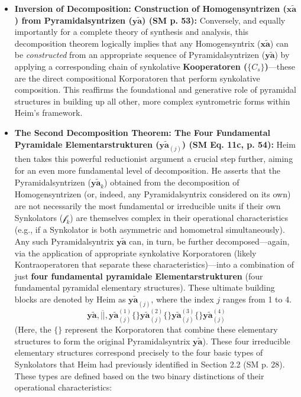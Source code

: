 \documentclass[12pt]{article}
\newcommand{\syntrix}{\bm{y\widetilde{a}}}
\newcommand{\homogeneoussyntrix}{\bm{x\widetilde{a}}}
\newcommand{\synkolator}{\mathcal{f}}
\newcommand{\elementarstruktur}{\bm{y\widetilde{a}}_{(j)}}
\begin{document}
\begin{itemize}
    \item \textbf{Inversion of Decomposition: Construction of Homogensyntrizen (\(\homogeneoussyntrix\)) from Pyramidalsyntrizen (\(\syntrix\)) (SM p. 53):}
    Conversely, and equally importantly for a complete theory of synthesis and analysis, this decomposition theorem logically implies that any Homogensyntrix (\(\homogeneoussyntrix\)) can be \textit{constructed} from an appropriate sequence of Pyramidalsyntrizen (\(\syntrix\)) by applying a corresponding chain of synkolative \textbf{Kooperatoren (\( \{C_s\} \))}—these are the direct compositional Korporatoren that perform synkolative composition. This reaffirms the foundational and generative role of pyramidal structures in building up all other, more complex syntrometric forms within Heim's framework.

    \item \textbf{The Second Decomposition Theorem: The Four Fundamental Pyramidale Elementarstrukturen (\(\elementarstruktur\)) (SM Eq. 11c, p. 54):}
    Heim then takes this powerful reductionist argument a crucial step further, aiming for an even more fundamental level of decomposition. He asserts that the Pyramidalsyntrizen (\( \syntrix_k \)) obtained from the decomposition of Homogensyntrizen (or, indeed, any Pyramidalsyntrix considered on its own) are not necessarily the most fundamental or irreducible units if their own Synkolators (\( \synkolator_k \)) are themselves complex in their operational characteristics (e.g., if a Synkolator is both asymmetric and homometral simultaneously). Any such Pyramidalsyntrix \( \syntrix \) can, in turn, be further decomposed—again, via the application of appropriate synkolative Korporatoren (likely Kontraoperatoren that separate these characteristics)—into a combination of just \textbf{four fundamental pyramidale Elementarstrukturen} (four fundamental pyramidal elementary structures). These ultimate building blocks are denoted by Heim as \( \elementarstruktur \), where the index \( j \) ranges from 1 to 4.
    \begin{equation}
    \syntrix, \overline{||}, \elementarstruktur^{(1)} \{ \} \elementarstruktur^{(2)} \{ \} \elementarstruktur^{(3)} \{ \} \elementarstruktur^{(4)}
    \label{eq:pyramidal_to_elementar_original}
    \end{equation}
    (Here, the \( \{ \} \) represent the Korporatoren that combine these elementary structures to form the original Pyramidalsyntrix \( \syntrix \)). These four irreducible elementary structures correspond precisely to the four basic types of Synkolators that Heim had previously identified in Section 2.2 (SM p. 28). These types are defined based on the two binary distinctions of their operational characteristics:

\end{itemize}
\end{document}
